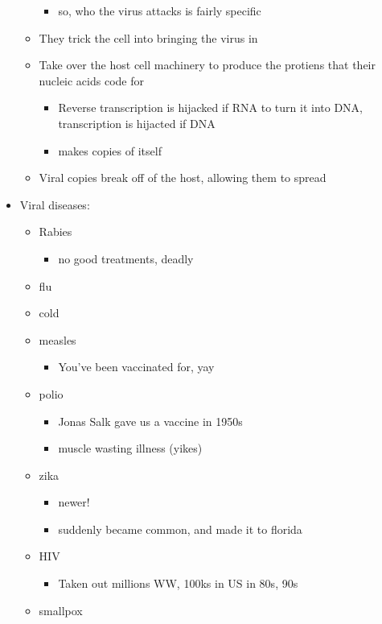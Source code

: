 \documentclass{article}
\theoremstyle{definition}
\begin{document}
\begin{itemize}
\begin{itemize}
\begin{itemize}
					\item so, who the virus attacks is fairly specific
				\end{itemize}
			\item They trick the cell into bringing the virus in
			\item Take over the host cell machinery to produce the protiens that their nucleic acids code for
				\begin{itemize}
					\item Reverse transcription is hijacked if RNA to turn it into DNA, transcription is hijacted if DNA
					\item makes copies of itself
				\end{itemize}
			\item Viral copies break off of the host, allowing them to spread
		\end{itemize}
	\item Viral diseases:
		\begin{itemize}
			\item Rabies
				\begin{itemize}
					\item no good treatments, deadly
				\end{itemize}
			\item flu
			\item cold
			\item measles
				\begin{itemize}
					\item You've been vaccinated for, yay
				\end{itemize}
			\item polio
				\begin{itemize}
					\item Jonas Salk gave us a vaccine in 1950s
					\item muscle wasting illness (yikes)
				\end{itemize}
			\item zika
				\begin{itemize}
					\item newer!
					\item suddenly became common, and made it to florida
				\end{itemize}
			\item HIV
				\begin{itemize}
					\item Taken out millions WW, 100ks in US in 80s, 90s
				\end{itemize}
			\item smallpox

\end{itemize}
\end{itemize}
\end{document}
